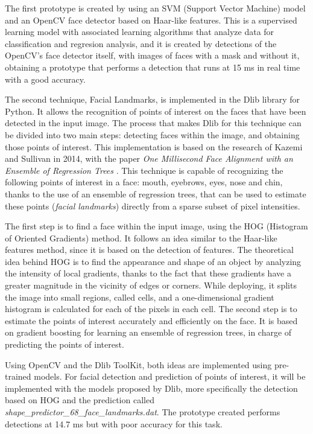The first prototype is created by using an SVM (Support Vector Machine) model and an OpenCV face detector based on Haar-like features. This is a supervised learning model with associated learning algorithms that analyze data for classification and regresion analysis, and it is created by detections of the OpenCV's face detector itself, with images of faces with a mask and without it, obtaining a prototype that performs a detection that runs at 15 ms in real time with a good accuracy.

The second technique, Facial Landmarks, is implemented in the Dlib library for Python. It allows the recognition of points of interest on the faces that have been detected in the input image. The process that makes Dlib for this technique can be divided into two main steps: detecting faces within the image, and obtaining those points of interest. This implementation is based on the research of Kazemi and Sullivan in 2014, with the paper \textit{One Millisecond Face Alignment with an Ensemble of Regression Trees} \cite{faceLandmark}. This technique is capable of recognizing the following points of interest in a face: mouth, eyebrows, eyes, nose and chin, thanks to the use of an ensemble of regression trees, that can be used to estimate these points (\textit{facial landmarks}) directly from a sparse subset of pixel intensities.

The first step is to find a face within the input image, using the HOG (Histogram of Oriented Gradients) method. It follows an idea similar to the Haar-like features method, since it is based on the detection of features. The theoretical idea behind HOG is to find the appearance and shape of an object by analyzing the intensity of local gradients, thanks to the fact that these gradients have a greater magnitude in the vicinity of edges or corners. While deploying, it splits the image into small regions, called cells, and a one-dimensional gradient histogram is calculated for each of the pixels in each cell. The second step is to estimate the points of interest accurately and efficiently on the face. It is based on gradient boosting for learning an ensemble of regression trees, in charge of predicting the points of interest. 

Using OpenCV and the Dlib ToolKit, both ideas are implemented using pre-trained models. For facial detection and prediction of points of interest, it will be implemented with the models proposed by Dlib, more specifically the detection based on HOG and the prediction called \textit{shape\_predictor\_68\_face\_landmarks.dat}. The prototype created performs detections at 14.7 ms but with poor accuracy for this task. 

